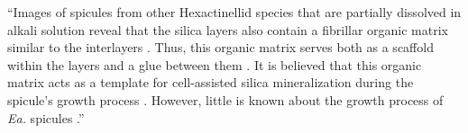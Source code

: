 \documentclass[11pt,letterpaper]{report}
\makeatletter
\newcommand{\EA}{\textit{Ea.\@}\xspace}
\makeatother
\begin{document}
\begin{enumerate}[label=\textit{1.\arabic*},wide, labelwidth=!, labelindent=0pt]
``Images of spicules from other Hexactinellid species that are partially dissolved in alkali solution reveal that the silica layers also contain a fibrillar organic matrix similar to the interlayers \cite{ehrlich2006modern, ehrlich2008nanostructural, ehrlich2010mineralization}. Thus, this organic matrix serves both as a scaffold within the layers and a glue between them \cite{ehrlich2016supercontinuum}.
%
%
It is believed that this organic matrix acts as a template for cell-assisted silica mineralization during the spicule's growth process \cite{ehrlich2006modern, ehrlich2008nanostructural, ehrlich2010mineralization, wysokowski2018biosilica}. However, little is known about the growth process of \EA spicules \cite{wysokowski2018biosilica}.''

\end{enumerate}

\clearpage



\end{document}
